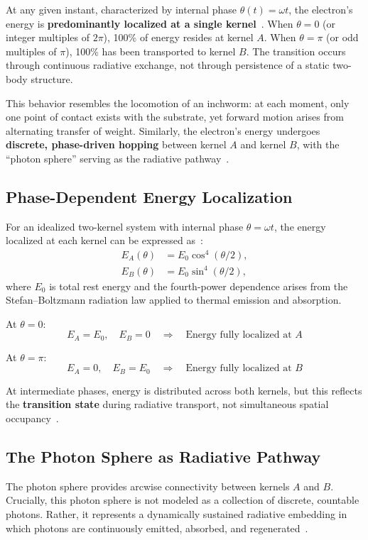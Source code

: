 \documentclass[12pt,letterpaper]{article}
\begin{document}
At any given instant, characterized by internal phase $\theta(t) = \omega t$, the electron's energy is \textbf{predominantly localized at a single kernel}~\cite{hanamura17765017}. When $\theta = 0$ (or integer multiples of $2\pi$), 100\% of energy resides at kernel $A$. When $\theta = \pi$ (or odd multiples of $\pi$), 100\% has been transported to kernel $B$. The transition occurs through continuous radiative exchange, not through persistence of a static two-body structure.

This behavior resembles the locomotion of an inchworm: at each moment, only one point of contact exists with the substrate, yet forward motion arises from alternating transfer of weight. Similarly, the electron's energy undergoes \textbf{discrete, phase-driven hopping} between kernel $A$ and kernel $B$, with the ``photon sphere'' serving as the radiative pathway~\cite{hanamura18511664}.

\subsection{Phase-Dependent Energy Localization}

For an idealized two-kernel system with internal phase $\theta = \omega t$, the energy localized at each kernel can be expressed as~\cite{hanamura16759284,hanamura18356895}:
\begin{align}
E_A(\theta) &= E_0 \cos^4(\theta/2), \\
E_B(\theta) &= E_0 \sin^4(\theta/2),
\end{align}
where $E_0$ is total rest energy and the fourth-power dependence arises from the Stefan--Boltzmann radiation law applied to thermal emission and absorption.

At $\theta = 0$:
\[
E_A = E_0, \quad E_B = 0 \quad \Rightarrow \quad \text{Energy fully localized at } A
\]

At $\theta = \pi$:
\[
E_A = 0, \quad E_B = E_0 \quad \Rightarrow \quad \text{Energy fully localized at } B
\]

At intermediate phases, energy is distributed across both kernels, but this reflects the \textbf{transition state} during radiative transport, not simultaneous spatial occupancy~\cite{hanamura18356895}.

\subsection{The Photon Sphere as Radiative Pathway}

The photon sphere provides arcwise connectivity between kernels $A$ and $B$. Crucially, this photon sphere is not modeled as a collection of discrete, countable photons. Rather, it represents a dynamically sustained radiative embedding in which photons are continuously emitted, absorbed, and regenerated~\cite{hanamura16759284}.
\end{document}
